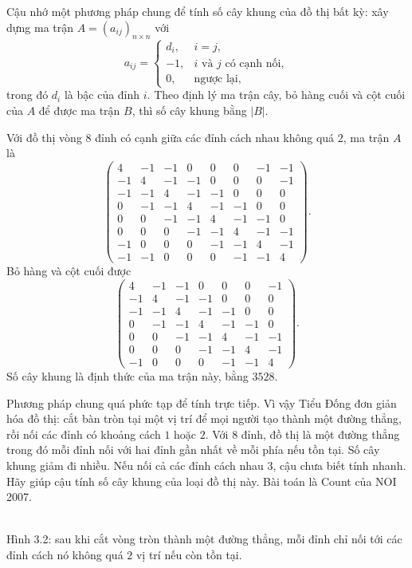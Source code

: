 \documentclass[11pt]{article}
\begin{document}
Cậu nhớ một phương pháp chung để tính số cây khung của đồ thị bất kỳ: xây dựng
ma trận $A=(a_{ij})_{n\times n}$ với
\[
  a_{ij}=
  \begin{cases}
    d_i, & i=j,\\
    -1, & i\text{ và }j\text{ có cạnh nối},\\
    0, & \text{ngược lại},
  \end{cases}
\]
trong đó $d_i$ là bậc của đỉnh $i$. Theo định lý ma trận cây, bỏ hàng cuối và
cột cuối của $A$ để được ma trận $B$, thì số cây khung bằng $|B|$.

Với đồ thị vòng $8$ đỉnh có cạnh giữa các đỉnh cách nhau không quá $2$, ma
trận $A$ là
\[
\begin{pmatrix}
4&-1&-1&0&0&0&-1&-1\\
-1&4&-1&-1&0&0&0&-1\\
-1&-1&4&-1&-1&0&0&0\\
0&-1&-1&4&-1&-1&0&0\\
0&0&-1&-1&4&-1&-1&0\\
0&0&0&-1&-1&4&-1&-1\\
-1&0&0&0&-1&-1&4&-1\\
-1&-1&0&0&0&-1&-1&4
\end{pmatrix}.
\]
Bỏ hàng và cột cuối được
\[
\begin{pmatrix}
4&-1&-1&0&0&0&-1\\
-1&4&-1&-1&0&0&0\\
-1&-1&4&-1&-1&0&0\\
0&-1&-1&4&-1&-1&0\\
0&0&-1&-1&4&-1&-1\\
0&0&0&-1&-1&4&-1\\
-1&0&0&0&-1&-1&4
\end{pmatrix}.
\]
Số cây khung là định thức của ma trận này, bằng $3528$.

Phương pháp chung quá phức tạp để tính trực tiếp. Vì vậy Tiểu Đống đơn giản
hóa đồ thị: cắt bàn tròn tại một vị trí để mọi người tạo thành một đường thẳng,
rồi nối các đỉnh có khoảng cách $1$ hoặc $2$. Với $8$ đỉnh, đồ thị là một
đường thẳng trong đó mỗi đỉnh nối với hai đỉnh gần nhất về mỗi phía nếu tồn
tại. Số cây khung giảm đi nhiều. Nếu nối cả các đỉnh cách nhau $3$, cậu chưa
biết tính nhanh. Hãy giúp cậu tính số cây khung của loại đồ thị này. Bài toán
là Count của NOI 2007.

\begin{center}
\\
\small Hình 3.2: sau khi cắt vòng tròn thành một đường thẳng, mỗi đỉnh chỉ
nối tới các đỉnh cách nó không quá $2$ vị trí nếu còn tồn tại.
\end{center}
\end{document}
